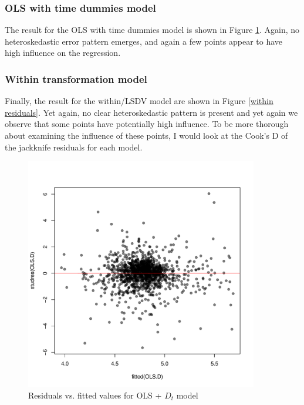 \documentclass{article}
\begin{document}
\subsubsection{OLS with time dummies model}
The result for the OLS with time dummies model is shown in Figure \ref{ols time residuals}. Again, no heteroskedastic error pattern emerges, and again a few points appear to have high influence on the regression.

\subsubsection{Within transformation model}
Finally, the result for the within/LSDV model are shown in Figure \ref{within residuals}. Yet again, no clear heteroskedastic pattern is present and yet again we observe that some points have potentially high influence. To be more thorough about examining the influence of these points, I would look at the Cook's D of the jackknife residuals for each model.

\begin{figure}[H]
\centering
\includegraphics[width = 4in]{figures/residuals2.pdf}
\caption{Residuals vs. fitted values for OLS + $D_t$ model }
\label{ols time residuals}
\end{figure}
\end{document}
